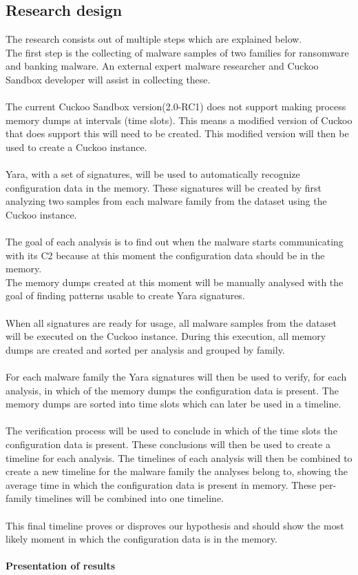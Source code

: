 \documentclass[conference]{IEEEtran}
\begin{document}
\subsection{Research design}
The research consists out of  multiple steps which are explained below.\\

The first step is the collecting of malware samples of two families for ransomware and banking malware. An external expert malware researcher and Cuckoo Sandbox developer will assist in collecting these. \\\\The current Cuckoo Sandbox version(2.0-RC1) does not support making process memory dumps at intervals (\Gls{time slots}). This means a modified version of Cuckoo that does support this will need to be created. This modified version will then be used to create a Cuckoo instance.\\\\Yara, with a set of signatures, will be used to automatically recognize \Gls{configuration data} in the memory. These signatures will be created by first analyzing two samples from each malware family from the dataset using the Cuckoo instance. \\\\The goal of each analysis is to find out when the malware starts communicating with its \Gls{C2} because at this moment the \Gls{configuration data} should be in the memory.\\The memory dumps created at this moment will be manually analysed with the goal of finding patterns usable to create Yara signatures.\\\\ When all signatures are ready for usage, all malware samples from the dataset will be executed on the Cuckoo instance. During this execution, all memory dumps are created and sorted per analysis and grouped by family.\\\\For each malware family the Yara signatures will then be used to verify, for each analysis, in which of the memory dumps the \Gls{configuration data} is present. The memory dumps are sorted into \Gls{time slots} which can later be used in a timeline.\\\\The verification process will be used to conclude in which of the \Gls{time slots} the \Gls{configuration data} is present. These conclusions will then be used to create a timeline for each analysis.  The timelines of each analysis will then be combined to create a new timeline for the malware family the analyses belong to, showing the average time in which the \Gls{configuration data} is present in memory. These per-family timelines will be combined into one timeline. \\\\This final timeline proves or disproves our hypothesis and should show the most likely moment in which the \Gls{configuration data} is in the memory.\\\\ \textbf{Presentation of results}\\
\end{document}
